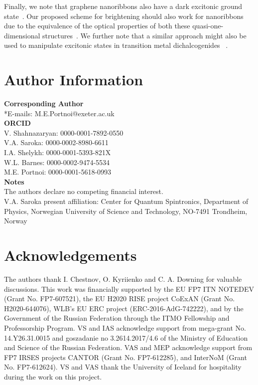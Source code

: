 \documentclass[journal=aamick,manuscript=article]{achemso}
\begin{document}
Finally, we note that graphene nanoribbons also have a dark excitonic ground state~\cite{Yang2007}.
Our proposed scheme for brightening should also work for nanoribbons due to the equivalence of the optical properties of both these quasi-one-dimensional structures~\cite{Portnoi2015,Saroka2017}. We further note that a similar approach might also be used to manipulate excitonic states in transition metal dichalcogenides ~\cite{Deilmann_PRB_2017_96_201113}.\\





\section*{Author Information}
{\bf Corresponding Author}\\
*E-mails: 
M.E.Portnoi@exeter.ac.uk\\
{\bf ORCID}\\
V. Shahnazaryan: 0000-0001-7892-0550 \\
V.A. Saroka: 0000-0002-8980-6611\\
I.A. Shelykh: 0000-0001-5393-821X\\
W.L. Barnes:  0000-0002-9474-5534\\
M.E. Portnoi: 0000-0001-5618-0993\\
{\bf Notes}\\
The authors declare no competing financial interest.\\
V.A. Saroka present affiliation: Center for Quantum Spintronics, Department of Physics, Norwegian University of Science and Technology, NO-7491 Trondheim, Norway

\section*{Acknowledgements}
The authors thank I. Chestnov, O. Kyriienko and C. A. Downing for valuable discussions. This work was financially supported by the EU FP7 ITN NOTEDEV (Grant No. FP7-607521), the EU H2020 RISE project CoExAN (Grant No. H2020-644076), WLB's EU ERC project (ERC-2016-AdG-742222), and by the Government of the Russian Federation through the ITMO Fellowship and Professorship Program. VS and IAS acknowledge support from mega-grant No. 14.Y26.31.0015 and goszadanie no 3.2614.2017/4.6 of the Ministry of Education and Science of the Russian Federation.  VAS and MEP acknowledge support from FP7 IRSES projects CANTOR (Grant No. FP7-612285), and InterNoM (Grant No. FP7-612624). VS and VAS thank the University of Iceland for hospitality during the work on this project.
\end{document}
